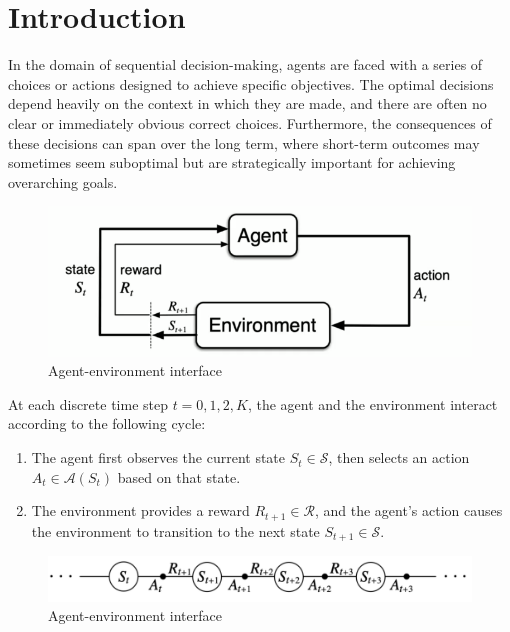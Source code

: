 \section{Introduction}

In the domain of sequential decision-making, agents are faced with a series of choices or actions designed to achieve specific objectives. 
The optimal decisions depend heavily on the context in which they are made, and there are often no clear or immediately obvious correct choices. 
Furthermore, the consequences of these decisions can span over the long term, where short-term outcomes may sometimes seem suboptimal but are strategically important for achieving overarching goals.
\begin{figure}[H]
    \centering
    \includegraphics[width=0.75\linewidth]{images/rl.png}
    \caption{Agent-environment interface}
\end{figure}
At each discrete time step $t = 0, 1, 2, K$, the agent and the environment interact according to the following cycle:
\begin{enumerate}
    \item The agent first observes the current state $S_t \in \mathcal{S}$, then selects an action $A_t \in \mathcal{A}(S_t)$ based on that state.
    \item The environment provides a reward $R_{t+1} \in \mathcal{R}$, and the agent's action causes the environment to transition to the next state $S_{t+1} \in \mathcal{S}$.
\end{enumerate}
\begin{figure}[H]
    \centering
    \includegraphics[width=0.75\linewidth]{images/rl1.png}
    \caption{Agent-environment interface}
\end{figure}